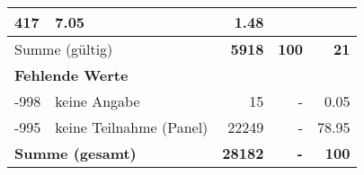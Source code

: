 \begin{longtable}{lXrrr}
       \num{417} &
       \num[round-mode=places,round-precision=2]{7.05} &
         \num[round-mode=places,round-precision=2]{1.48} \\
     \midrule
     \multicolumn{2}{l}{Summe (gültig)} &
       \textbf{\num{5918}} &
     \textbf{\num{100}} &
       \textbf{\num[round-mode=places,round-precision=2]{21}} \\
     \multicolumn{5}{l}{\textbf{Fehlende Werte}}\\
       -998 &
       keine Angabe &
         \num{15} &
        - &
         \num[round-mode=places,round-precision=2]{0.05} \\
       -995 &
       keine Teilnahme (Panel) &
         \num{22249} &
        - &
         \num[round-mode=places,round-precision=2]{78.95} \\
     \midrule
     \multicolumn{2}{l}{\textbf{Summe (gesamt)}} &
          \textbf{\num{28182}} &
        \textbf{-} &
        \textbf{\num{100}} \\
     \bottomrule
     \end{longtable}
     
